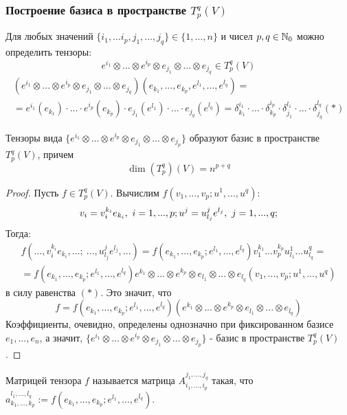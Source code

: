 \subsubsection*{Построение базиса в пространстве $T_p^q(V)$}
Для любых значений $\{i_1,\dots i_p,j_1,\dots,j_q\}\in \{1,\dots,n\}$ и чисел $p,q \in \mathbb{N}_0$ можно определить тензоры:
\[e^{i_1}\otimes \dots \otimes e^{i_p}\otimes e_{j_1}\otimes \dots\otimes e_{j_q}\in T_p^q(V)\]
\begin{multline*}
    (e^{i_1}\otimes ... \otimes e^{i_p}\otimes e_{j_1}\otimes ... \otimes e_{j_q})(e_{k_1}, ... ,e_{k_p},e^{l_1},...,e^{l_q})=\\
    =e^{i_1}(e_{k_1})\cdot ... \cdot e^{i_p}(e_{k_p})\cdot e_{j_1}(e^{l_1})\cdot ... \cdot e_{j_q}(e^{l_q}) = \delta_{k_1}^{i_1}\cdot ... \cdot \delta_{k_p}^{i_p} \cdot \delta_{j_1}^{l_1}\cdot ... \cdot \delta_{j_q}^{l_q} (*)
\end{multline*}
\begin{theorem}
    Тензоры вида $\{e^{i_1}\otimes \dots \otimes e^{i_p}\otimes e_{j_1}\otimes \dots\otimes e_{j_p}\}$ образуют базис в пространстве $T_p^q(V)$, причем
    \[\dim{(T_p^q)}(V)=n^{p+q}\]
\end{theorem}
\begin{proof}
    Пусть $f \in T_p^q(V)$. Вычислим $f(v_1,...,v_p; u^1,...,u^q)$:
    \[v_i = v_i^{k_i}e_{k_i}, \ i = 1,...,p; \\ u^j = u_{l_j}^j e^{l_j}, \ j = 1,...,q;\]
    Тогда:
    \begin{multline*}
        f(...,v_i^{k_i}e_{k_i},...; \ ...,u_{l_j}^j e^{l_j},...) = f(e_{k_1},...,e_{k_p}; e^{l_1},...,e^{l_q})v_1^{k_1}...v_p^{k_p}u_{l_1}^1...u_{l_q}^q =\\= f(e_{k_1},...,e_{k_p}; e^{l_1},...,e^{l_q}) e^{k_1}\otimes...\otimes e^{k_p}\otimes e_{l_1}\otimes...\otimes  e_{l_q} (v_1,...,v_p; u^1,...,u^q) 
    \end{multline*}
    в силу равенства $(*)$. Это значит, что
    \[f = f(e_{k_1},...,e_{k_p}; e^{l_1},...,e^{l_q})(e^{k_1}\otimes...\otimes e^{k_p}\otimes e_{l_1}\otimes...\otimes e_{l_q})\]
    Коэффициенты, очевидно, определены однозначно при фиксированном базисе $e_1,...,e_n$, а значит, $\{e^{i_1}\otimes \dots \otimes e^{i_p}\otimes e_{j_1}\otimes \dots\otimes e_{j_p}\}$ - базис в пространстве $T_p^q(V)$.  
\end{proof}
\begin{definition}
    Матрицей тензора $f$ называется матрица $A_{i_1,...,i_p}^{j_1,...,j_q}$ такая, что $a_{k_1,...,k_p}^{l_1,...,l_q} := f(e_{k_1},...,e_{k_p}; e^{l_1},...,e^{l_q})$.
\end{definition}

